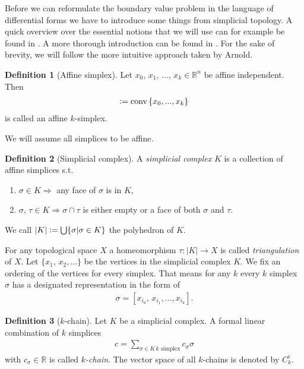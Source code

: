 \documentclass[12pt,a4paper]{article}
\theoremstyle{definition}
\newtheorem{definition}{Definition}
\newcommand{\real}{\mathbb{R}}
\begin{document}
Before we can reformulate the boundary value problem in the language of 
differential forms we have to 
introduce some things from simplicial topology. A quick overview over the
essential notions that we will use can for example be found in 
\cite[Chapter 2]{arnold}. A more thorough introduction can be found in 
\cite[Chapter 4]{topology_and_geometry}. For the sake of brevity, we will 
follow the more intuitive approach taken by Arnold.


\begin{definition}[Affine simplex]
    Let $x_0$, $x_1$, ..., $x_k \in \real^n$ be affine independent. Then 
    \begin{align*}
    [x_0,x_1,...,x_k] \vcentcolon= \text{conv}\,\{x_0,...,x_k\}
    \end{align*}
    is called an affine $k$-simplex.
\end{definition}
\noindent We will assume all simplices to be affine.

\begin{definition}[Simplicial complex]
    A \textit{simplicial complex} $K$ is a collection of affine simplices s.t.
    \begin{enumerate}
        \item $\sigma \in K \Rightarrow$ any face of $\sigma$ is in $K$,
        \item $\sigma,\, \tau \in K \Rightarrow \sigma \cap \tau$  
                is either empty or a face of both $\sigma$ and $\tau$.
    \end{enumerate}
    We call $|K| \vcentcolon= \bigcup \{ \sigma | \sigma \in K\}$ the polyhedron of 
    $K$.
\end{definition}
For any topological space $X$ a homeomorphism 
$\tau: |K| \rightarrow X$ is called \textit{triangulation} of $X$.
Let $\{x_1,\, x_2,...\}$ be the vertices in the simplicial complex $K$.
We fix an ordering of the vertices for every simplex. 
That means for any $k$ every $k$ simplex $\sigma$ has
a designated representation in the form of
\begin{align*}
    \sigma = [x_{i_0},\, x_{i_1}, ...,x_{i_k}].
\end{align*} 

\begin{definition}[$k$-chain]
    Let $K$ be a simplicial complex. A formal linear combination of $k$ 
    simplices
    \begin{align*}
        c = \sum\limits_{\sigma \in K\, k \text{ simplex}} c_\sigma \sigma
    \end{align*}
    with $c_\sigma \in \real$ is called \textit{$k$-chain}. The vector space 
    of all $k$-chains is denoted by ${C}^\text{c}_k$.
\end{definition}
\end{document}
